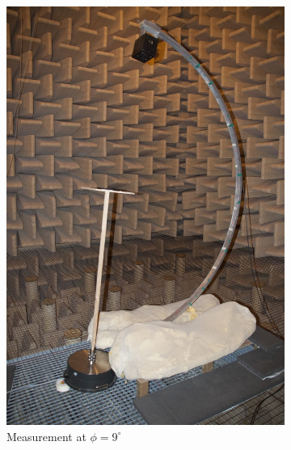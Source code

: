 \begin{figure}[h!]
\begin{subfigure}[b]{0.33\textwidth}
    			\includegraphics[height=0.28\textheight]{afbeeldingen/opstelling_schuin.jpg}
    			\caption{Measurement at $\phi=9^\circ$}
			    \label{fig:phi=9}
                
        \end{subfigure}~
        \begin{subfigure}[b]{0.33\textwidth}
			    

\end{subfigure}
\end{figure}
